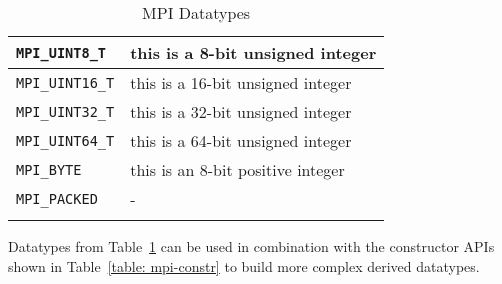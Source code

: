 \begin{longtable}{|>{\centering\arraybackslash} m{5.5cm} | >{\centering\arraybackslash} m{6cm} |}
        \small \texttt{MPI\_UINT8\_T}                 & \small this is a 8-bit unsigned integer                                                       \\ \hline
        \small \texttt{MPI\_UINT16\_T}                & \small this is a 16-bit unsigned integer                                                      \\ \hline
        \small \texttt{MPI\_UINT32\_T}                & \small this is a 32-bit unsigned integer                                                      \\ \hline
        \small \texttt{MPI\_UINT64\_T}                & \small this is a 64-bit unsigned integer                                                      \\ \hline
        \small \texttt{MPI\_BYTE}                     & \small this is an 8-bit positive integer                                                      \\ \hline
        \small \texttt{MPI\_PACKED}                   & -                                                                                             \\ \hline
        \caption{MPI Datatypes}
        \label{table: mpi-types}
\end{longtable}

Datatypes from Table~\ref{table: mpi-types} can be used in combination with the constructor APIs shown in Table~\ref{table: mpi-constr} to build more complex derived datatypes.

